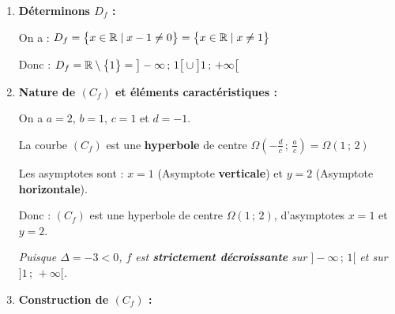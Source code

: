 \documentclass[10pt, a4paper]{article}
\begin{document}
\begin{Solution}[APPLICATION][26]
\begin{enumerate}[leftmargin=*,itemsep=0.5pt]
    \item \textbf{Déterminons $D_f$ :}
    
      On a : \quad  $D_f = \big\{ x \in \mathbb{R} \mid x - 1 \neq 0 \big\} = \big\{ x \in \mathbb{R} \mid x \neq 1 \big\}$
      
    Donc : \quad $D_f = \mathbb{R} \setminus \big\{1\big\} = \big]-\infty\,;\,1\big[ \cup \big]1\,;\,+\infty\big[$

    \item \textbf{Nature de $(C_f)$ et éléments caractéristiques :}

    On a $a = 2$, $b = 1$, $c = 1$ et $d = -1$.

    La courbe $(C_f)$ est une \textbf{hyperbole} de centre 
     $\Omega\!\left(-\frac{d}{c}\,;\,\frac{a}{c}\right) = \Omega(1\,;\,2)$ 

    Les asymptotes sont :
         $x = 1$ (Asymptote \textbf{verticale})
        et $y = 2$ (Asymptote \textbf{horizontale}).
        
    Donc : $(C_f)$ est une hyperbole de centre $\Omega(1\,;\,2)$, d'asymptotes $x = 1$ et $y = 2$.

    \textit{Puisque $\Delta = -3 < 0$, $f$ est \textbf{strictement décroissante} sur $\big]-\infty\,;\,1\big[$ et sur $\big]1\,;\,+\infty\big[$.}

    \item \textbf{Construction de $(C_f)$ :}
\begin{center}
\end{center}
\end{enumerate}
\end{Solution}
\end{document}
